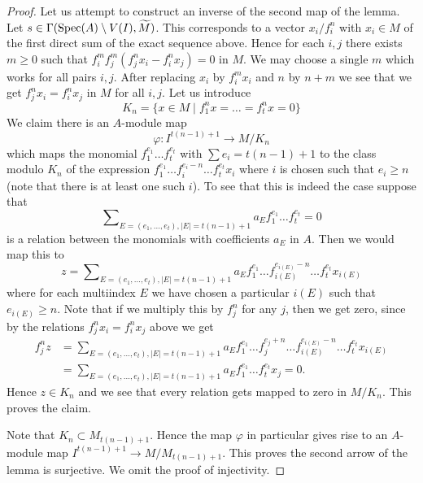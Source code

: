 \begin{proof}
\medskip\noindent
Let us attempt to construct an inverse of the second map of the lemma.
Let $s \in \Gamma(\mathop{\mathrm{Spec}}(A) \setminus V(I), \widetilde{M})$.
This corresponds to a vector $x_i/f_i^n$ with $x_i \in M$ of the
first direct sum of the exact sequence above.
Hence for each $i, j$ there exists $m \geq 0$
such that $f_i^m f_j^m (f_j^n x_i - f_i^n x_j) = 0$ in $M$.
We may choose a single $m$ which works for all pairs $i, j$.
After replacing $x_i$ by $f_i^mx_i$ and $n$ by $n + m$ we see
that we get $f_j^nx_i = f_i^nx_j$ in $M$ for all $i, j$.
Let us introduce
$$
K_n = \{x \in M \mid f_1^nx = \ldots = f_t^nx = 0\}
$$
We claim there is an $A$-module map
$$
\varphi :
I^{t(n - 1) + 1}
\longrightarrow
M/K_n
$$
which maps the monomial
$f_1^{e_1} \ldots f_t^{e_t}$ with $\sum e_i = t(n - 1) + 1$
to the class modulo $K_n$ of the expression
$f_1^{e_1} \ldots f_i^{e_i - n} \ldots f_t^{e_t}x_i$
where $i$ is chosen such that $e_i \geq n$ (note that there
is at least one such $i$).
To see that this is indeed the case suppose that
$$
\sum\nolimits_{E = (e_1, \ldots, e_t), |E| = t(n - 1) + 1}
a_E f_1^{e_1} \ldots f_t^{e_t} = 0
$$
is a relation between the monomials with coefficients $a_E$ in $A$.
Then we would map this to
$$
z =
\sum\nolimits_{E = (e_1, \ldots, e_t), |E| = t(n - 1) + 1}
a_E f_1^{e_1} \ldots f_{i(E)}^{e_{i(E)} - n} \ldots f_t^{e_t}x_{i(E)}
$$
where for each multiindex $E$ we have chosen a particular $i(E)$
such that $e_{i(E)} \geq n$.
Note that if we multiply this by $f_j^n$ for any $j$, then
we get zero, since by the relations $f_j^nx_i = f_i^nx_j$ above we get
\begin{align*}
f_j^nz & = \sum\nolimits_{E = (e_1, \ldots, e_t), |E| = t(n - 1) + 1}
a_E f_1^{e_1} \ldots f_j^{e_j + n}
\ldots f_{i(E)}^{e_{i(E)} - n} \ldots f_t^{e_t}x_{i(E)} \\
& =
\sum\nolimits_{E = (e_1, \ldots, e_t), |E| = t(n - 1) + 1}
a_E f_1^{e_1} \ldots f_t^{e_t}x_j
= 0.
\end{align*}
Hence $z \in K_n$ and we see that every relation gets mapped to zero
in $M/K_n$. This proves the claim.

\medskip\noindent
Note that $K_n \subset M_{t(n - 1) + 1}$. Hence the
map $\varphi$ in particular gives rise to an $A$-module map
$I^{t(n - 1) + 1} \to M/M_{t(n - 1) + 1}$.
This proves the second arrow of the lemma is surjective.
We omit the proof of injectivity.
\end{proof}

